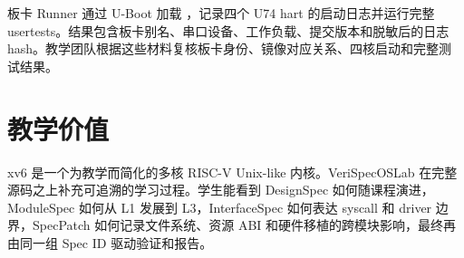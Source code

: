 板卡 Runner 通过 U-Boot 加载 ，记录四个 U74 hart 的启动日志并运行完整 usertests。结果包含板卡别名、串口设备、工作负载、提交版本和脱敏后的日志 hash。教学团队根据这些材料复核板卡身份、镜像对应关系、四核启动和完整测试结果。

\section{教学价值}

xv6 是一个为教学而简化的多核 RISC-V Unix-like 内核\cite{xv6-book}。VeriSpecOSLab 在完整源码之上补充可追溯的学习过程。学生能看到 DesignSpec 如何随课程演进，ModuleSpec 如何从 L1 发展到 L3，InterfaceSpec 如何表达 syscall 和 driver 边界，SpecPatch 如何记录文件系统、资源 ABI 和硬件移植的跨模块影响，最终再由同一组 Spec ID 驱动验证和报告。
